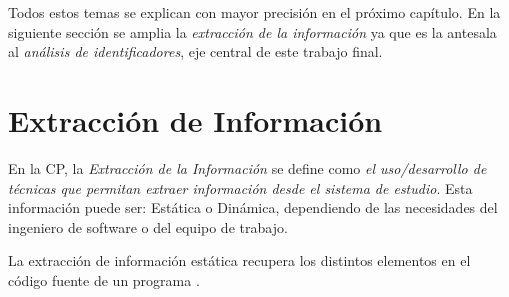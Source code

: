 \documentclass[a4paper,12pt]{report}
\begin{document}
Todos estos temas se explican con mayor precisión en el próximo capítulo. En la siguiente sección se amplia la \textit{extracción de la información} ya que es la antesala al \textit{análisis de identificadores}, eje central de este trabajo final.









\section{Extracción de Información}

En la CP, la \textit{Extracción de la Información} se define como \textit{el uso/desarrollo de técnicas que permitan extraer información desde el sistema de estudio}. 
Esta información puede ser: Estática o Dinámica, dependiendo de las necesidades del 
ingeniero de software o del equipo de trabajo.

La extracción de información estática recupera los distintos elementos en el código fuente de un programa \cite{AHUL06}. 

\end{document}
